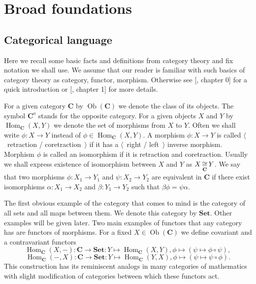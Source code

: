 
\section{Broad foundations}\label{SectionBroadFoundations} 


\subsection{Categorical language}\label{SubSectionCategoricalLanguage}

Here we recall some basic facts and definitions from category theory and fix
notation we shall use. We assume that our reader is familiar with such basics of
category theory as category, functor, morphism. Otherwise see
[\cite{HelLectAndExOnFuncAn}, chapter 0] for a quick introduction or
[\cite{KashivShapCatsAndSheavs}, chapter 1] for more details.

For a given category $\mathbf{C}$ by $\operatorname{Ob}(\mathbf{C})$ we denote
the class of its objects. The symbol $\mathbf{C}^o$ stands for the opposite
category. For a given objects $X$ and $Y$ by 
$\operatorname{Hom}_{\mathbf{C}}(X, Y)$ 
we denote the set of morphisms from $X$ to $Y$. Often we shall write
$\phi:X\to Y$ instead of $\phi\in\operatorname{Hom}_{\mathbf{C}}(X,Y)$. A
morphism $\phi:X\to Y$ is called $\langle$~retraction / coretraction~$\rangle$
if it has a $\langle$~right / left~$\rangle$ inverse morphism. Morphism $\phi$
is called an isomorphism if it is retraction and coretraction. Usually we shall
express existence of isomorphism between $X$ and $Y$ as $X\mathop{\mathbin{\cong}}\limits_{\mathbf{C}} Y$.
We say that two morphisms $\phi:X_1\to Y_1$ and $\psi:X_2\to Y_2$ are equivalent
in $\mathbf{C}$ if there exist isomorphisms $\alpha:X_1\to X_2$ and
$\beta:Y_1\to Y_2$ such that $\beta\phi=\psi\alpha$.

The first obvious example of the category that comes to mind is the category of
all sets and all maps between them. We denote this category by $\mathbf{Set}$.
Other examples will be given later. Two main examples of functors that any
category has are functors of morphisms. For a fixed
$X\in\operatorname{Ob}(\mathbf{C})$ we define covariant and a contravariant
functors
$$
\operatorname{Hom}_{\mathbf{C}}(X,-)
:\mathbf{C}\to\mathbf{Set}:Y\mapsto \operatorname{Hom}_{\mathbf{C}}(X,Y), 
\phi\mapsto(\psi\mapsto \phi\circ\psi),
$$
$$
\operatorname{Hom}_{\mathbf{C}}(-,X)
:\mathbf{C}\to\mathbf{Set}:Y\mapsto \operatorname{Hom}_{\mathbf{C}}(Y,X), 
\phi\mapsto(\psi\mapsto \psi\circ\phi).
$$
This construction has its reminiscent analogs in many categories of mathematics
with slight modification of categories between which these functors act.

